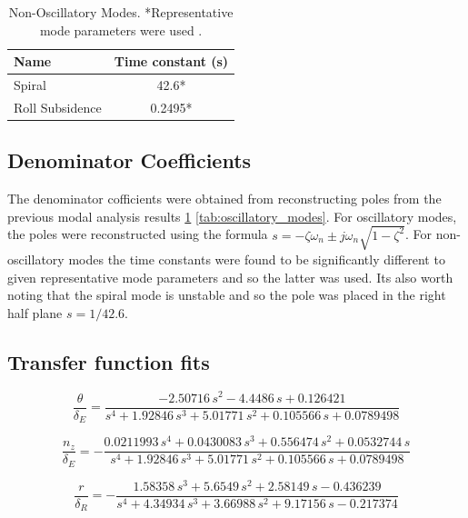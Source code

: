 \documentclass{article}
\begin{document}
\begin{table}[H]
  \centering
  \begin{tabular}{lc}
      \toprule
      Name & Time constant (s) \\
      \midrule
      Spiral & 42.6* \\
      Roll Subsidence & 0.2495* \\
      \bottomrule
  \end{tabular}
  \caption{Non-Oscillatory Modes. *Representative mode parameters were used \cite{rep}.}
  \label{tab:non_oscillatory_modes}
\end{table}

\subsection{Denominator Coefficients}

The denominator cofficients were obtained from reconstructing poles from the previous modal analysis results \ref{tab:non_oscillatory_modes} \ref{tab:oscillatory_modes}.
For oscillatory modes, the poles were reconstructed using the formula $s = -\zeta\omega_n \pm j\omega_n\sqrt{1-\zeta^2}$.
For non-oscillatory modes the time constants were found to be significantly different to given representative mode parameters \cite{rep} and so the latter was used.
Its also worth noting that the spiral mode is unstable and so the pole was placed in the right half plane $s = 1/42.6$.


\subsection{Transfer function fits}

\begin{equation}
    \frac{\theta}{\delta_E} =
    \frac{-2.50716\,s^2-4.4486\,s+0.126421}{s^4+1.92846\,s^3+5.01771\,s^2+0.105566\,s+0.0789498}
    \label{eq:pitch_elev}
\end{equation}

\begin{equation}
    \frac{n_z}{\delta_E} =
    -\frac{0.0211993\,s^4+0.0430083\,s^3+0.556474\,s^2+0.0532744\,s}{s^4+1.92846\,s^3+5.01771\,s^2+0.105566\,s+0.0789498}
    \label{eq:naccel_elev}
\end{equation}

\begin{equation}
    \frac{r}{\delta_R} =
    -\frac{1.58358\,s^3+5.6549\,s^2+2.58149\,s-0.436239}{s^4+4.34934\,s^3+3.66988\,s^2+9.17156\,s-0.217374}
    \label{eq:yaw_rud}
\end{equation}
\end{document}
